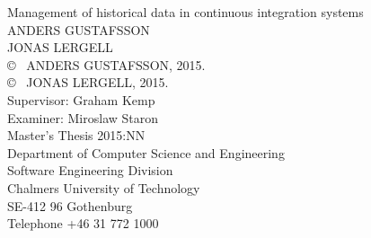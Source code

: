 \newpage
\thispagestyle{plain}
\vspace*{4.5cm}
Management of historical data in continuous integration systems\\
ANDERS GUSTAFSSON\\
JONAS LERGELL\\[0.5cm]

\copyright ~ ANDERS GUSTAFSSON, 2015.\\
\copyright ~ JONAS LERGELL, 2015.\\[0.5cm]

Supervisor: Graham Kemp \\
Examiner: Miroslaw Staron \\[0.5cm]

Master's Thesis 2015:NN\\
Department of Computer Science and Engineering\\
Software Engineering Division\\
Chalmers University of Technology\\
SE-412 96 Gothenburg\\
Telephone +46 31 772 1000\\

\vfill

